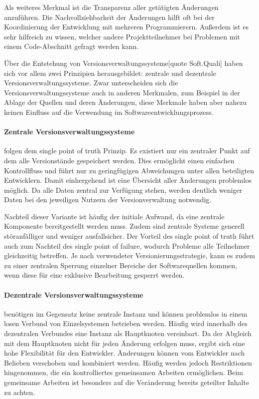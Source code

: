 Als weiteres Merkmal ist die Transparenz aller getätigten Änderungen anzuführen. Die Nachvollziehbarkeit der Änderungen 
hilft oft bei der Koordinierung der Entwicklung mit mehreren Programmierern. Außerdem ist es sehr hilfreich zu wissen, 
welcher andere Projektteilnehmer bei Problemen mit einem Code-Abschnitt gefragt werden kann. 

Über die Entstehung von Versionsverwaltungssysteme[quote Soft.Quali] haben sich vor allem zwei Prinzipien herausgebildet: 
zentrale und dezentrale Versionsverwaltungssysteme. Zwar unterscheiden sich die Versionsverwaltungssysteme auch in 
anderen Merkmalen, zum Beispiel in der Ablage der Quellen und deren Änderungen, diese Merkmale haben aber nahezu keinen 
Einfluss auf die Verwendung im Softwareentwicklungsprozess.

\paragraph{Zentrale Versionsverwaltungssysteme} folgen dem \glqq single point of truth\grqq{} Prinzip. Es existiert nur ein
zentraler Punkt auf dem alle Versionstände gespeichert werden. Dies ermöglicht einen einfachen Kontrollfluss und führt nur zu geringfügigen Abweichungen unter allen beteiligten Entwicklern. Damit einhergehend ist eine Übersicht aller Änderungen problemlos möglich. 
Da alle Daten zentral zur Verfügung stehen, werden deutlich weniger Daten bei den jeweiligen Nutzern der Versionverwaltung notwendig.

Nachteil dieser Variante ist häufig der initiale Aufwand, da eine zentrale Komponente bereitgestellt werden muss. Zudem 
sind zentrale Systeme generell störanfälliger und weniger ausfallsicher. Der Vorteil des \glqq single point of truth\grqq{} führt
auch zum Nachteil des \glqq single point of failure\grqq{}, wodurch Probleme alle Teilnehmer gleichzeitig betreffen.
Je nach verwendeter Versionierungsstrategie, kann es zudem zu einer zentralen Sperrung einzelner Bereiche der Softwarequellen kommen, wenn diese für eine exklusive Bearbeitung gesperrt werden.

\paragraph{Dezentrale Versionsverwaltungssysteme} benötigen im Gegensatz keine zentrale Instanz und können problemlos in einem losen Verbund von Einzelsystemen betrieben werden. 
Häufig wird innerhalb des dezentralen Verbundes eine Instanz als Hauptknoten vereinbart. Da der Abgleich mit dem Hauptknoten nicht für jeden Änderung erfolgen muss, ergibt sich eine hohe Flexibilität für den Entwickler. Änderungen können vom Entwickler nach Belieben verschoben und kombiniert werden.
Häufig werden jedoch Restriktionen hingenommen, die ein kontrolliertes gemeinsamen Arbeiten ermöglichen. Beim gemeinsame Arbeiten ist besonders auf die Veränderung bereits geteilter Inhalte zu achten.
 
